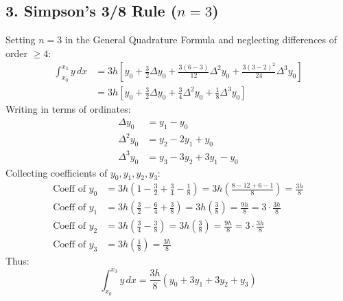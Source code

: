 \subsection{3. Simpson's 3/8 Rule \texorpdfstring{($n = 3$)}{(n = 3)}}
\begin{theorembox}
Setting $n = 3$ in the General Quadrature Formula and neglecting differences of order $\ge 4$:
\begin{align}
    \int_{x_0}^{x_3} y \, dx &= 3 h \left[ y_0 + \frac{3}{2}\Delta y_0 + \frac{3(6-3)}{12}\Delta^2 y_0 + \frac{3(3-2)^2}{24}\Delta^3 y_0 \right] \nonumber \\
    &= 3 h \left[ y_0 + \frac{3}{2}\Delta y_0 + \frac{3}{4}\Delta^2 y_0 + \frac{1}{8}\Delta^3 y_0 \right]
\end{align}
Writing in terms of ordinates:
\begin{align}
    \Delta y_0 &= y_1 - y_0 \nonumber \\
    \Delta^2 y_0 &= y_2 - 2 y_1 + y_0 \nonumber \\
    \Delta^3 y_0 &= y_3 - 3 y_2 + 3 y_1 - y_0
\end{align}
Collecting coefficients of $y_0, y_1, y_2, y_3$:
\begin{align}
    \text{Coeff of } y_0 &= 3 h \left( 1 - \frac{3}{2} + \frac{3}{4} - \frac{1}{8} \right) = 3 h \left( \frac{8 - 12 + 6 - 1}{8} \right) = \frac{3 h}{8} \nonumber \\
    \text{Coeff of } y_1 &= 3 h \left( \frac{3}{2} - \frac{6}{4} + \frac{3}{8} \right) = 3 h \left( \frac{3}{8} \right) = \frac{9 h}{8} = 3 \cdot \frac{3 h}{8} \nonumber \\
    \text{Coeff of } y_2 &= 3 h \left( \frac{3}{4} - \frac{3}{8} \right) = 3 h \left( \frac{3}{8} \right) = \frac{9 h}{8} = 3 \cdot \frac{3 h}{8} \nonumber \\
    \text{Coeff of } y_3 &= 3 h \left( \frac{1}{8} \right) = \frac{3 h}{8}
\end{align}
Thus:
\begin{equation}
    \boxed{\int_{x_0}^{x_3} y \, dx = \frac{3 h}{8} (y_0 + 3 y_1 + 3 y_2 + y_3)}
\end{equation}


\end{theorembox}
